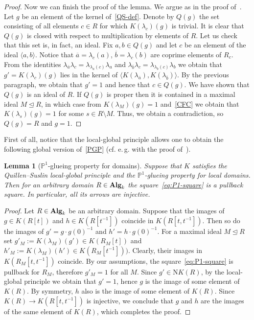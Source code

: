 \documentclass[oneside, 11pt]{amsart}
\numberwithin{equation}{section}
\newtheorem{lemma}{Lemma} \numberwithin{lemma}{section}
\theoremstyle{definition}
\theoremstyle{definition}
\theoremstyle{remark}
\newcommand{\catname}[1]{{\normalfont\textbf{#1}}} %
\begin{document}
\begin{proof}
 Now we can finish the proof of the lemma. We argue as in the proof of~\cite[Theorem~2]{S15}. Let $g$ be an element of the kernel of~\eqref{QS-def}. Denote by $Q(g)$ the set consisting of all elements $c \in R$ for which $K(\lambda_c)(g)$ is trivial. It is clear that $Q(g)$ is closed with respect to multiplication by elements of $R$. Let us check that this set is, in fact, an ideal. Fix $a, b \in Q(g)$ and let $c$ be an element of the ideal $\langle a, b \rangle$. Notice that $\overline{a} = \lambda_c(a)$, $\overline{b} = \lambda_c(b)$ are coprime elements of $R_c$. From the identities $\lambda_{\overline{a}}\lambda_c = \lambda_{\lambda_a(c)}\lambda_a$ and $\lambda_{\overline{b}}\lambda_c = \lambda_{\lambda_b(c)}\lambda_b$ we obtain that $g' = K(\lambda_c)(g)$ lies in the kernel of $\langle K(\lambda_{\overline{a}}), K(\lambda_{\overline{b}}) \rangle.$ By the previous paragraph, we obtain that $g' = 1$ and hence that $c \in Q(g)$. We have shown that $Q(g)$ is an ideal of $R$. If $Q(g)$ is proper then it is contained in a maximal ideal $M \trianglelefteq R$, in which case from $K(\lambda_M)(g) = 1$ and~\ref{CFC} we obtain that $K(\lambda_s)(g) = 1$ for some $s \in R \setminus M$. Thus, we obtain a contradiction, so $Q(g) = R$ and $g = 1$.
\end{proof}

First of all, notice that the local-global principle allows one to obtain the following global version of~\ref{PGP} (cf. e.\,g. with the proof of~\cite[Theorem~1]{LS20}). 
\begin{lemma}[$\mathbb{P}^1$-glueing property for domains] \label{ght}
Suppose that $K$ satisfies the Quillen--Suslin local-global principle and the $\mathbb{P}^1$-glueing property for local domains. Then for an arbitrary domain $R \in \catname{Alg}_k$ the square~\eqref{eq:P1-square} is a pullback square. In particular, all its arrows are injective. \end{lemma}
\begin{proof}
Let $R \in \catname{Alg}_k$ be an arbitrary domain. Suppose that the images of $g \in K(R[t])$ and $h \in K(R[t^{-1}])$ coincide in $K(R[t, t^{-1}])$. Then so do the images of $g' = g \cdot g(0)^{-1}$ and $h' = h \cdot g(0)^{-1}$. For a maximal ideal $M\trianglelefteq R$ set $g'_M := K(\lambda_M)(g') \in K(R_M[t])$ and $h'_M := K(\lambda_M)(h') \in K(R_M[t^{-1}]))$. Clearly, their images in $K(R_M[t, t^{-1}])$ coincide. By our assumptions, the square~\eqref{eq:P1-square} is pullback for $R_M$, therefore $g'_M = 1$ for all $M$. Since $g' \in \mathrm NK(R)$, by the local-global principle we obtain that $g' = 1$, hence $g$ is the image of some element of $K(R)$. By symmetry, $h$ also is the image of some element of $K(R)$. Since $K(R)\to K(R[t, t^{-1}])$ is injective, we conclude that $g$ and $h$ are the images of the same element of $K(R)$, which completes the proof.  \end{proof}
\end{document}
